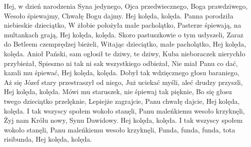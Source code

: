 \beginverse
Hej, w dzień narodzenia Syna jedynego,
Ojca przedwiecznego, Boga prawdziwego,
Wesoło śpiewajmy, Chwałę Bogu dajmy.
Hej kolęda, kolęda.
\endverse
\beginverse
Panna porodziła niebieskie dzieciątko,
W żłobie położyła małe pacholątko,
Pasterze śpiewają, na multankach grają,
Hej kolęda, kolęda.
\endverse
\beginverse
Skoro pastuszkowie o tym usłyszeli,
Zaraz do Betleem czemprędzej bieżeli,
Witając dzieciątko, małe pacholątko,
Hej kolęda, kolęda.
\endverse
\beginverse
Anioł Pański, sam ogłosił te dziwy, te dziwy,
Kuba nieboraczek nierychło przybieżał,
Spieszno ni tak ni sak wszystkiego odbieżał,
Nie miał Panu co dać, kazali mu śpiewać,
Hej kolęda, kolęda.
\endverse
\beginverse
Dobył tak wdzięcznego głosu baraniego,
Aż się Józef stary przestraszył od niego,
Już uciekać myśli, aleć drudzy przyszli,
Hej kolęda, kolęda.
\endverse
\beginverse
Mówi mu staruszek, nie śpiewaj tak pięknie,
Bo się głosu twego dzieciątko przelęknie,
Lepiejże zagrajcie, Panu chwałę dajcie,
Hej kolęda, kolęda.
\endverse
\beginverse
I tak wszyscy społem wokoło stanęli,
Panu maleńkiemu wesoło krzyknęli,
Żyj nam Królu nowy, Synu Dawidowy.
Hej kolęda, kolęda.
\endverse
\beginverse
I tak wszyscy społem wokoło stanęli,
Panu maleńkiemu wesoło krzyknęli,
Funda, funda, funda, tota risibunda,
Hej kolęda, kolęda.
\endverse
\endsong